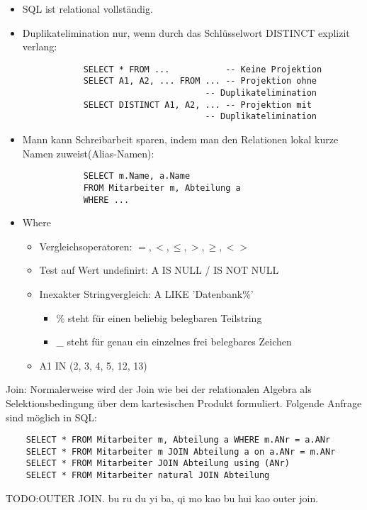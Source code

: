\begin{remark}
    \begin{itemize}
        \item SQL ist relational vollst\"andig.
        \item Duplikatelimination nur, wenn durch das Schlüsselwort DISTINCT explizit verlang:
              \begin{verbatim}
            SELECT * FROM ...           -- Keine Projektion
            SELECT A1, A2, ... FROM ... -- Projektion ohne
                                    -- Duplikatelimination
            SELECT DISTINCT A1, A2, ... -- Projektion mit
                                    -- Duplikatelimination
        \end{verbatim}
        \item Mann kann Schreibarbeit sparen, indem man den Relationen lokal kurze Namen zuweist(Alias-Namen):
              \begin{verbatim}
            SELECT m.Name, a.Name
            FROM Mitarbeiter m, Abteilung a
            WHERE ...
        \end{verbatim}
        \item Where\begin{itemize}
                  \item Vergleichsoperatoren: \(=, <, \leq, > , \geq ,<>\)
                  \item Test auf Wert undefinirt:  A IS NULL / IS NOT NULL
                  \item Inexakter Stringvergleich: A LIKE 'Datenbank\%'
                        \begin{itemize}
                            \item \% steht f\"ur einen beliebig belegbaren Teilstring
                            \item \_ steht f\"ur genau ein einzelnes frei belegbares Zeichen
                        \end{itemize}
                  \item A1 IN (2, 3, 4, 5, 12, 13)
              \end{itemize}
    \end{itemize}

\end{remark}

Join: Normalerweise wird der Join wie bei der relationalen Algebra als Selektionsbedingung über dem kartesischen Produkt formuliert.
Folgende Anfrage sind m\"oglich in SQL:
\begin{verbatim}
    SELECT * FROM Mitarbeiter m, Abteilung a WHERE m.ANr = a.ANr
    SELECT * FROM Mitarbeiter m JOIN Abteilung a on a.ANr = m.ANr
    SELECT * FROM Mitarbeiter JOIN Abteilung using (ANr)
    SELECT * FROM Mitarbeiter natural JOIN Abteilung
\end{verbatim}
TODO:OUTER JOIN. bu ru du yi ba, qi mo kao bu hui kao outer join.

